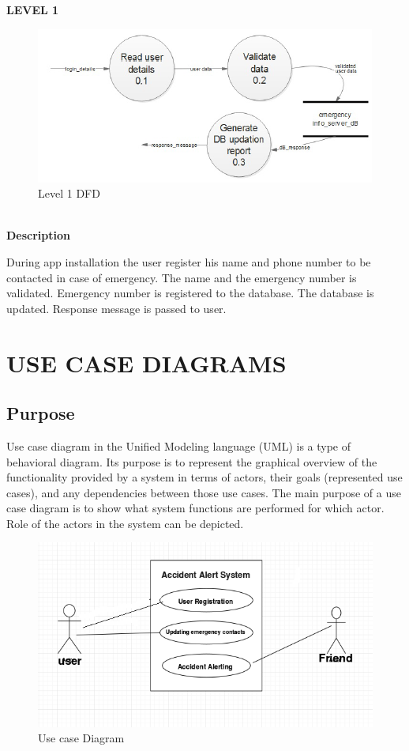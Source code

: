 \documentclass[12pt,a4paper,oneside]{report}
\begin{document}
{\newpage
\textbf{LEVEL 1}
\begin{figure}[h!]
\begin{center}
\includegraphics[scale=.8]{level1.png}
\caption{Level 1  DFD}
\label{Level 1  DFD}
\end{center}
\end{figure}
\\ 
\textbf{Description}
\par During app installation the user register his name and  phone number to be contacted in case of emergency. The name and the emergency number is validated. Emergency number is registered to the database. The database is updated. Response message is passed to user.



\newpage
\section{USE CASE DIAGRAMS}
\subsection{Purpose}
\par Use case diagram in the Uniﬁed Modeling language (UML) is a type of behavioral diagram. Its purpose is to represent the graphical overview of the functionality provided by a system in terms of actors, their goals (represented use cases), and any dependencies between those use cases. The main purpose of a use case diagram is to show what system functions are performed for which actor. Role of the actors in the system can be depicted.
\begin{figure}[h]
\begin{center}
\includegraphics[scale=1]{usecs1.png}
\caption{ Use case Diagram}
\label{ Use case Diagram}
\end{center}
\end{figure}
}
\end{document}
